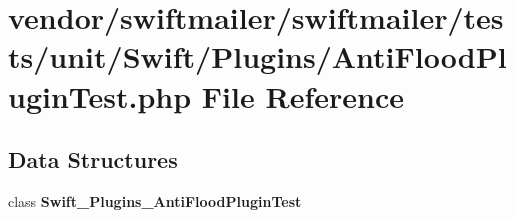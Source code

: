 \section{vendor/swiftmailer/swiftmailer/tests/unit/\+Swift/\+Plugins/\+Anti\+Flood\+Plugin\+Test.php File Reference}
\label{_anti_flood_plugin_test_8php}
\subsection*{Data Structures}
\begin{DoxyCompactItemize}
\item 
class {\bf Swift\+\_\+\+Plugins\+\_\+\+Anti\+Flood\+Plugin\+Test}
\end{DoxyCompactItemize}
